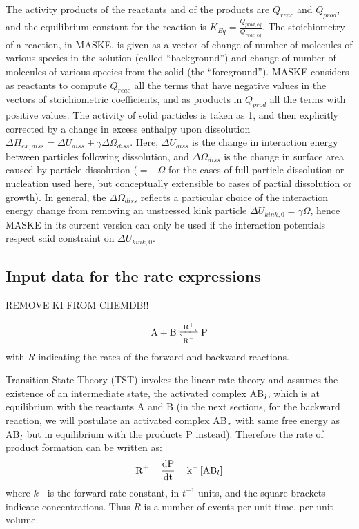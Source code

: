 \documentclass[12pt]{paper}    %
\begin{document}
The activity products of the reactants and of the products are $Q_{reac}$ and $Q_{prod}$, and the equilibrium constant for the reaction is $K_{Eq} = \frac{Q_{prod,eq}}{Q_{reac,eq}}$. The stoichiometry of a reaction, in MASKE, is given as a vector of change of number of molecules of various species in the solution (called ``background'') and change of number of molecules of various species from the solid (the ``foreground''). MASKE considers as reactants to compute $Q_{reac}$ all the terms that have negative values in the vectors of stoichiometric coefficients, and as products in $Q_{prod}$ all the terms with positive values. The activity of solid particles is taken as 1, and then explicitly corrected by a change in excess enthalpy upon dissolution $\Delta H_{ex,diss} = \Delta U_{diss} + \gamma \Delta\Omega_{diss}$. Here, $\Delta U_{diss}$ is the change in interaction energy between particles following dissolution, and $\Delta \Omega_{diss}$ is the change in surface area caused by particle dissolution ($= -\Omega$ for the cases of full particle dissolution or nucleation used here, but conceptually extensible to cases of partial dissolution or growth). In general, the $\Delta \Omega_{diss}$ reflects a particular choice of the interaction energy change from removing an unstressed kink particle $\Delta U_{kink,0} = \gamma \Omega$, hence MASKE in its current version can only be used if the interaction potentials respect said constraint on $\Delta U_{kink,0}$.





\subsection{Input data for the rate expressions}

REMOVE KI FROM CHEMDB!!



\vspace{5cm}



\begin{equation}
\ce{A + B <=>[R+][R-]
P}
\end{equation}
%
with $R$ indicating the rates of the forward and backward reactions.

Transition State Theory (TST) invokes the linear rate theory and assumes the existence of an intermediate state, the activated complex AB$\ce{_l}$, which is at equilibrium with the reactants A and B (in the next sections, for the backward reaction, we will postulate an activated complex AB$\ce{_r}$ with same free energy as AB$\ce{_l}$ but in equilibrium with the products P instead). Therefore the rate of product formation can be written as:
%
\begin{equation}
\ce{R+ = \frac{dP}{dt} = k+ [AB_l]}
\end{equation}
%
where $k^+$ is the forward rate constant, in $t^{-1}$ units, and the square brackets indicate concentrations. Thus $R$ is a number of events per unit time, per unit volume.
\end{document}
